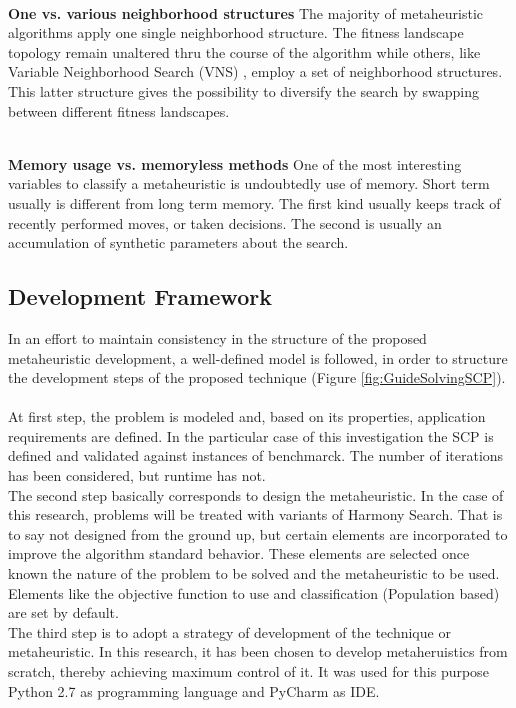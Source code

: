~\\
\textbf{One vs. various neighborhood structures}
The majority of metaheuristic algorithms apply one single neighborhood structure. The fitness landscape topology remain unaltered thru the course of the algorithm while others, like Variable Neighborhood Search (VNS) \cite{DBLP:journals/anor/SarasolaDSA16}, employ a set of neighborhood structures. This latter structure gives the possibility to diversify the search by swapping between different fitness landscapes.

~\\
\textbf{Memory usage vs. memoryless methods}
One of the most interesting variables to classify a metaheuristic is undoubtedly use of memory. Short term usually is different from long term memory. The first kind usually keeps track of recently performed moves, or taken decisions. The second is usually an accumulation of synthetic parameters about the search. 

\subsection{Development Framework}
In an effort to maintain consistency in the structure of the proposed metaheuristic development, a well-defined model is followed, in order to structure the development steps of the proposed technique (Figure \ref{fig:GuideSolvingSCP}). \\
~\\
At first step, the problem is modeled and, based on its properties, application requirements are defined. In the particular case of this investigation the SCP is defined and validated against instances of benchmarck. The number of iterations has been considered, but runtime has not.\\

The second step basically corresponds to design the metaheuristic. In the case of this research, problems will be treated with variants of Harmony Search. That is to say not designed from the ground up, but certain elements are incorporated to improve the algorithm standard behavior. These elements are selected once known the nature of the problem to be solved and the metaheuristic to be used. Elements like the objective function to use and classification (Population based) are set by default.\\

The third step is to adopt a strategy of development of the technique or metaheuristic. In this research, it has been chosen to develop metaheruistics from scratch, thereby achieving maximum control of it. It was used for this purpose Python 2.7 as programming language and  PyCharm as IDE.\\

